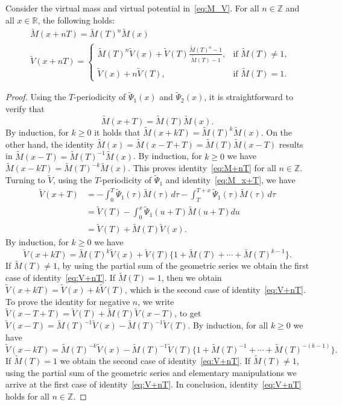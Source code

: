 \begin{lemma}
	\label{lem:MVprop}
	Consider the virtual mass and virtual potential
	in~\eqref{eq:M_V}. For all $n \in \mathbb{Z}$ and all $x \in \mathbb{R}$, the
	following holds:
				\begin{align}
	& \tilde{M}(x +  nT) = \tilde{M}(T)^{n}\tilde{M}(x) \label{eq:M+nT}\\
		& \tilde{V}(x + nT) = \begin{cases} \tilde{M}(T)^{n}\tilde{V}(x)+
	\tilde{V}(T)\displaystyle\frac{\tilde{M}(T)^{n}
		-1}{\tilde{M}(T) - 1}, & \text{if } \tilde{M}(T)\neq 1,\\
			\tilde{V}(x) + n\tilde{V}(T), & \text{if } \tilde{M}(T)=1.
	\end{cases}\label{eq:V+nT}
	\end{align}
			\end{lemma}
\begin{proof}
	Using the $T$-periodicity of  $\tilde{\Psi}_1(x)$ and
	$\tilde{\Psi}_2(x)$, it is straightforward to verify that 
				\begin{equation}
	\label{eq:M_x+T}
	\tilde M(x+T)=\tilde{M}(T)\tilde{M}(x). 
	\end{equation}
				By induction, for $k \geq 0$ it holds that $\tilde{M}(x + kT) =
	\tilde{M}(T)^{k}\tilde{M}(x)$. On the other hand, the identity
	$\tilde{M}(x)=\tilde{M}(x-T+T)=\tilde{M}(T)\tilde{M}(x-T)$ results in
	$\tilde{M}(x-T)=\tilde{M}(T)^{-1}\tilde{M}(x)$. By induction, for $k
	\geq 0$ we have $\tilde{M}(x - kT) =
	\tilde{M}(T)^{-k}\tilde{M}(x)$. This proves identity~\eqref{eq:M+nT}
	for all $n \in \mathbb{Z}$.  Turning to $\tilde V$, using the $T$-periodicity
	of $\tilde \Psi_1$ and identity~\eqref{eq:M_x+T}, we have
				\[
	\begin{aligned}
	\tilde{V}(x+T) &=-\int_0^{T}\tilde{\Psi}_1(\tau)\tilde{M}(\tau)\,d\tau-
	\int_T^{T+x}\tilde{\Psi}_1(\tau)\tilde{M}(\tau)\,d\tau \\
		&= \tilde{V}(T) -
	\int_0^{x}\tilde{\Psi}_1(u+T)\tilde{M}(u+T) du \\
		&= \tilde{V}(T)+\tilde{M}(T)\tilde{V}(x).
	\end{aligned}
	\]
				By induction, for $k \geq 0$ we have
				\[
	\tilde{V}(x+kT) = \tilde{M}(T)^{k}\tilde{V}(x)+
	\tilde{V}(T)\{1+\tilde{M}(T)+\cdots+\tilde{M}(T)^{k-1}\}.
	\]
				If $\tilde M(T) \neq 1$, by using the partial sum of the geometric
	series we obtain the first case of identity~\eqref{eq:V+nT}. If
	$\tilde M(T)=1$, then we obtain $\tilde V(x+kT) = \tilde V(x) + k
	\tilde V(T)$, which is the second case of identity~\eqref{eq:V+nT}. To
	prove the identity for negative $n$, we write $\tilde{V}(x-T+T) =
	\tilde{V}(T) + \tilde{M}(T)\tilde{V}(x-T)$, to get $\tilde{V}(x-T) =
	\tilde{M}(T)^{-1}\tilde{V}(x)-\tilde{M}(T)^{-1}\tilde{V}(T)$. By
	induction, for all $ k \geq 0$ we have
				\[
	\tilde{V}(x-kT) = \tilde{M}(T)^{-k}\tilde{V}(x)-\tilde
	M(T)^{-1}\tilde{V}(T)\{1+\tilde{M}(T)^{-1}+\cdots+\tilde{M}(T)^{-(k-1)}\}.
	\]
				If $\tilde M(T)=1$ we obtain the second case of
	identity~\eqref{eq:V+nT}. If $\tilde M(T) \neq 1$, using the partial
	sum of the geometric series and elementary manipulations we arrive at
	the first case of identity~\eqref{eq:V+nT}. In conclusion,
	identity~\eqref{eq:V+nT} holds for all $n \in \mathbb{Z}$.
	\qquad\end{proof}
